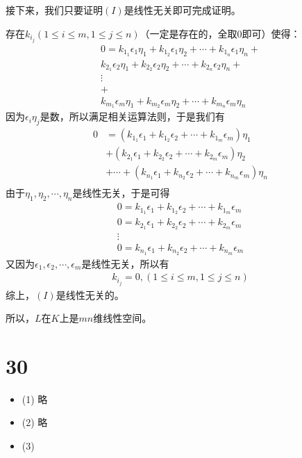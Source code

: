 \documentclass{article}
\begin{document}
接下来，我们只要证明$(I)$是线性无关即可完成证明。

存在$k_{i_j} (1 \leq i \leq m, 1 \leq j \leq n)$（一定是存在的，全取0即可）使得：
\begin{align*}
  0 =
  k_{1_1} \epsilon_1 \eta_1 + k_{1_2} \epsilon_1 \eta_2 + \cdots + k_{1_n} \epsilon_1 \eta_n + \\
  k_{2_1} \epsilon_2 \eta_1 + k_{2_2} \epsilon_2 \eta_2 + \cdots + k_{2_n} \epsilon_2 \eta_n + \\
  \vdots                                                                                       \\
  +                                                                                            \\
  k_{m_1} \epsilon_m \eta_1 + k_{m_2} \epsilon_m \eta_2 + \cdots + k_{m_n} \epsilon_m \eta_n
\end{align*}
因为$\epsilon_i \eta_j$是数，所以满足相关运算法则，于是我们有
\begin{align*}
  0 & = (k_{1_1} \epsilon_1 + k_{1_2} \epsilon_2 + \cdots + k_{1_m} \epsilon_m)\eta_1          \\
    & + (k_{2_1} \epsilon_1 + k_{2_2} \epsilon_2 + \cdots + k_{2_m} \epsilon_m)\eta_2          \\
    & + \cdots + (k_{n_1} \epsilon_1 + k_{n_2} \epsilon_2 + \cdots + k_{n_m} \epsilon_m)\eta_n \\
\end{align*}
由于$\eta_1, \eta_2, \cdots, \eta_n$是线性无关，于是可得
\begin{align*}
  0 = k_{1_1} \epsilon_1 + k_{1_2} \epsilon_2 + \cdots + k_{1_m} \epsilon_m \\
  0 = k_{2_1} \epsilon_1 + k_{2_2} \epsilon_2 + \cdots + k_{2_m} \epsilon_m \\
  \vdots                                                                    \\
  0 = k_{n_1} \epsilon_1 + k_{n_2} \epsilon_2 + \cdots + k_{n_m} \epsilon_m
\end{align*}
又因为$\epsilon_1, \epsilon_2, \cdots, \epsilon_m$是线性无关，所以有
\begin{align*}
  k_{i_j} = 0, (1 \leq i \leq m, 1 \leq j \leq n) 
\end{align*}
综上，$(I)$是线性无关的。

所以，$L$在$K$上是$mn$维线性空间。

\section*{30}

\begin{itemize}
  \item (1) 略

  \item (2) 略 

  \item (3) 
\end{itemize}
\end{document}
